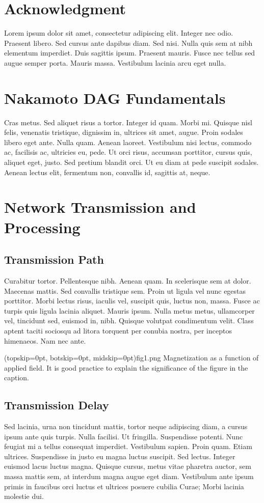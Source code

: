 \documentclass[peerreview]{ieeesyscoin}
\begin{document}
\appendices

\section*{Acknowledgment}
Lorem ipsum dolor sit amet, consectetur adipiscing elit. Integer nec odio. Praesent libero. Sed cursus ante dapibus diam. Sed nisi. Nulla quis sem at nibh elementum imperdiet. Duis sagittis ipsum. Praesent mauris. Fusce nec tellus sed augue semper porta. Mauris massa. Vestibulum lacinia arcu eget nulla. 


\section{Nakamoto DAG Fundamentals}

Cras metus. Sed aliquet risus a tortor. Integer id quam. Morbi mi. Quisque nisl felis, venenatis tristique, dignissim in, ultrices sit amet, augue. Proin sodales libero eget ante. Nulla quam. Aenean laoreet. Vestibulum nisi lectus, commodo ac, facilisis ac, ultricies eu, pede. Ut orci risus, accumsan porttitor, cursus quis, aliquet eget, justo. Sed pretium blandit orci. Ut eu diam at pede suscipit sodales. Aenean lectus elit, fermentum non, convallis id, sagittis at, neque. 


\section{Network Transmission and Processing}

\subsection{Transmission Path}
Curabitur tortor. Pellentesque nibh. Aenean quam. In scelerisque sem at dolor. Maecenas mattis. Sed convallis tristique sem. Proin ut ligula vel nunc egestas porttitor. Morbi lectus risus, iaculis vel, suscipit quis, luctus non, massa. Fusce ac turpis quis ligula lacinia aliquet. Mauris ipsum. Nulla metus metus, ullamcorper vel, tincidunt sed, euismod in, nibh. Quisque volutpat condimentum velit. Class aptent taciti sociosqu ad litora torquent per conubia nostra, per inceptos himenaeos. Nam nec ante. 

\Figure[t!](topskip=0pt, botskip=0pt, midskip=0pt){fig1.png}
{Magnetization as a function of applied field.
It is good practice to explain the significance of the figure in the caption.\label{fig1}}

\subsection{Transmission Delay}
Sed lacinia, urna non tincidunt mattis, tortor neque adipiscing diam, a cursus ipsum ante quis turpis. Nulla facilisi. Ut fringilla. Suspendisse potenti. Nunc feugiat mi a tellus consequat imperdiet. Vestibulum sapien. Proin quam. Etiam ultrices. Suspendisse in justo eu magna luctus suscipit. Sed lectus. Integer euismod lacus luctus magna. Quisque cursus, metus vitae pharetra auctor, sem massa mattis sem, at interdum magna augue eget diam. Vestibulum ante ipsum primis in faucibus orci luctus et ultrices posuere cubilia Curae; Morbi lacinia molestie dui. 
\end{document}
